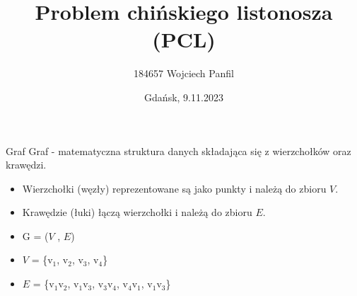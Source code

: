 \documentclass[polish,envcountsect,10pt]{beamer}
\title{Problem chińskiego listonosza (PCL)}
\author{184657 Wojciech Panfil}
\date{Gdańsk, 9.11.2023}
\begin{document}
\frame{\titlepage}

\begin{frame}{Graf}
    Graf - matematyczna struktura danych składająca się z wierzchołków oraz krawędzi.
    \begin{itemize}
        \item Wierzchołki (węzły) reprezentowane są jako punkty i należą do zbioru $V$.
        \item Krawędzie (łuki) łączą wierzchołki i należą do zbioru $E$.
    \end{itemize}
    \begin{center}
    \end{center}
    \begin{itemize}
        \item G = ($V$ , $E$)
        \item $V$ = \{v$_1$, v$_2$, v$_3$, v$_4$\}
        \item $E$ = \{v$_1$v$_2$, v$_1$v$_3$, v$_3$v$_4$, v$_4$v$_1$, v$_1$v$_3$\}
    \end{itemize}
\end{frame}
\end{document}
